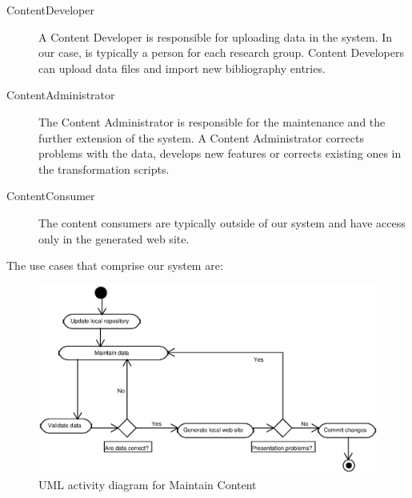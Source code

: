 \documentclass[10pt]{article}
\begin{document}
\begin{description}
\item[ContentDeveloper] A Content Developer is responsible for uploading data in the system. 
In our case, is typically a person for each research group. Content Developers can upload data files and 
import new bibliography entries.

\item[ContentAdministrator] The Content Administrator is responsible for the maintenance 
and the further extension of the system. A Content Administrator corrects problems with the data, develops 
new features or corrects existing ones in the transformation scripts.

\item[ContentConsumer] The content consumers are typically outside of our system
and have access only in the generated web site.
\end{description}

The use cases that comprise our system are:

\begin{figure}
\includegraphics[scale=0.6]{maintain-content-activity}
\caption{UML activity diagram for Maintain Content}
\label{fig:maintain-content-diagram}
\end{figure}
\end{document}
